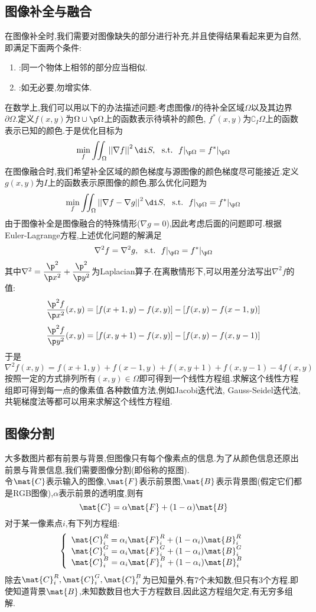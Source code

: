 \documentclass{ctexart}
\begin{document}
\subsection{图像补全与融合}
在图像补全时,我们需要对图像缺失的部分进行补充,并且使得结果看起来更为自然,即满足下面两个条件:
\begin{enumerate}[label=\tbf{\arabic*.},topsep=0pt,parsep=0pt,itemsep=0pt,partopsep=0pt]
    \item {}:同一个物体上相邻的部分应当相似.
    \item {}:如无必要,勿增实体.
\end{enumerate}
\indent 在数学上,我们可以用以下的办法描述问题:考虑图像$I$的待补全区域$\Omega$以及其边界$\partial \Omega$.定义$f(x,y)$为$\Omega\cup\p\Omega$上的函数表示待填补的颜色, $f^\ast(x,y)$为$\complement_I\Omega$上的函数表示已知的颜色.于是优化目标为
\[\min_f\iint_{\Omega}\left|\left|\nabla f\right|\right|^2\di S,\ \ \text{s.t.}\ \ f|_{\p\Omega}=f^\ast|_{\p\Omega}\]
在图像融合时,我们希望补全区域的颜色梯度与源图像的颜色梯度尽可能接近.定义$g(x,y)$为$I$上的函数表示原图像的颜色,那么优化问题为
\[\min_f\iint_{\Omega}\left|\left|\nabla f-\nabla g\right|\right|^2\di S,\ \ \text{s.t.}\ \ f|_{\p\Omega}=f^\ast|_{\p\Omega}\]
由于图像补全是图像融合的特殊情形($\nabla g=0$),因此考虑后面的问题即可.根据Euler-Lagrange方程,上述优化问题的解满足
\[\nabla^2f=\nabla^2g,\ \ \text{s.t.}\ \ f|_{\p\Omega}=f^\ast|_{\p\Omega}\]
其中$\nabla^2=\dfrac{\p^2}{\p x^2}+\dfrac{\p^2}{\p y^2}$为Laplacian算子.在离散情形下,可以用差分法写出$\nabla^2f$的值:
\[\dfrac{\p^2f}{\p x^2}(x,y)=[f(x+1,y)-f(x,y)]-[f(x,y)-f(x-1,y)]\]
\[\dfrac{\p^2f}{\p y^2}(x,y)=[f(x,y+1)-f(x,y)]-[f(x,y)-f(x,y-1)]\]
于是
\[\nabla^2 f(x,y)=f(x+1,y)+f(x-1,y)+f(x,y+1)+f(x,y-1)-4f(x,y)\]
按照一定的方式排列所有$(x,y)\in\Omega$即可得到一个线性方程组.求解这个线性方程组即可得到每一点的像素值.各种数值方法,例如Jacobi迭代法, Gauss-Seidel迭代法,共轭梯度法等都可以用来求解这个线性方程组.
\subsection{图像分割}
大多数图片都有前景与背景,但图像只有每个像素点的信息.为了从颜色信息还原出前景与背景信息,我们需要图像分割(即俗称的抠图).\\
\indent 令$\mat{C}$表示输入的图像,$\mat{F}$表示前景图,$\mat{B}$表示背景图(假定它们都是RGB图像),$\alpha$表示前景的透明度,则有
\[\mat{C}=\alpha\mat{F}+(1-\alpha)\mat{B}\]
对于某一像素点$i$,有下列方程组:
\[\left\{\begin{array}{l}
    \mat{C}_i^R=\alpha_i\mat{F}_i^R+(1-\alpha_i)\mat{B}_i^R\\
    \mat{C}_i^G=\alpha_i\mat{F}_i^G+(1-\alpha_i)\mat{B}_i^G\\
    \mat{C}_i^B=\alpha_i\mat{F}_i^B+(1-\alpha_i)\mat{B}_i^B
\end{array}\right.\]
除去$\mat{C}_i^R,\mat{C}_i^G,\mat{C}_i^B$为已知量外,有7个未知数,但只有3个方程.即使知道背景$\mat{B}$,未知数数目也大于方程数目,因此这方程组欠定,有无穷多组解.
\end{document}
